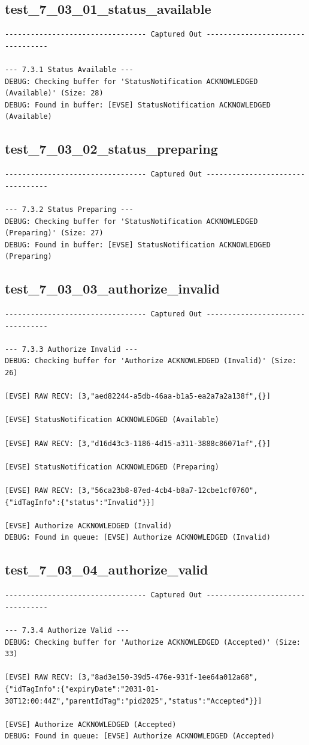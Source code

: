 \documentclass{article}
\begin{document}
\subsection*{test\_7\_03\_01\_status\_available}
\begin{lstlisting}
--------------------------------- Captured Out ---------------------------------

--- 7.3.1 Status Available ---
DEBUG: Checking buffer for 'StatusNotification ACKNOWLEDGED (Available)' (Size: 28)
DEBUG: Found in buffer: [EVSE] StatusNotification ACKNOWLEDGED (Available)
\end{lstlisting}
\subsection*{test\_7\_03\_02\_status\_preparing}
\begin{lstlisting}
--------------------------------- Captured Out ---------------------------------

--- 7.3.2 Status Preparing ---
DEBUG: Checking buffer for 'StatusNotification ACKNOWLEDGED (Preparing)' (Size: 27)
DEBUG: Found in buffer: [EVSE] StatusNotification ACKNOWLEDGED (Preparing)
\end{lstlisting}
\subsection*{test\_7\_03\_03\_authorize\_invalid}
\begin{lstlisting}
--------------------------------- Captured Out ---------------------------------

--- 7.3.3 Authorize Invalid ---
DEBUG: Checking buffer for 'Authorize ACKNOWLEDGED (Invalid)' (Size: 26)

[EVSE] RAW RECV: [3,"aed82244-a5db-46aa-b1a5-ea2a7a2a138f",{}]

[EVSE] StatusNotification ACKNOWLEDGED (Available)

[EVSE] RAW RECV: [3,"d16d43c3-1186-4d15-a311-3888c86071af",{}]

[EVSE] StatusNotification ACKNOWLEDGED (Preparing)

[EVSE] RAW RECV: [3,"56ca23b8-87ed-4cb4-b8a7-12cbe1cf0760",{"idTagInfo":{"status":"Invalid"}}]

[EVSE] Authorize ACKNOWLEDGED (Invalid)
DEBUG: Found in queue: [EVSE] Authorize ACKNOWLEDGED (Invalid)
\end{lstlisting}
\subsection*{test\_7\_03\_04\_authorize\_valid}
\begin{lstlisting}
--------------------------------- Captured Out ---------------------------------

--- 7.3.4 Authorize Valid ---
DEBUG: Checking buffer for 'Authorize ACKNOWLEDGED (Accepted)' (Size: 33)

[EVSE] RAW RECV: [3,"8ad3e150-39d5-476e-931f-1ee64a012a68",{"idTagInfo":{"expiryDate":"2031-01-30T12:00:44Z","parentIdTag":"pid2025","status":"Accepted"}}]

[EVSE] Authorize ACKNOWLEDGED (Accepted)
DEBUG: Found in queue: [EVSE] Authorize ACKNOWLEDGED (Accepted)
\end{lstlisting}
\end{document}
